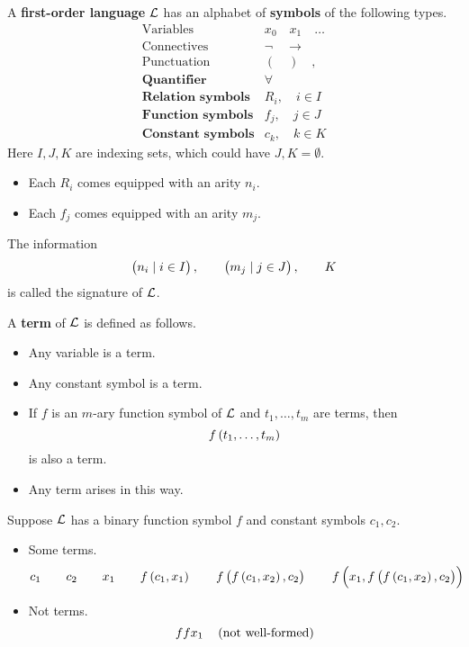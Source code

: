 \begin{definition}
\label{def:2.2.1}
A \textbf{first-order language} $ \mathcal{L} $ has an alphabet of \textbf{symbols} of the following types.
$$
\begin{array}{ll}
\text{Variables} & x_0 \quad x_1 \quad \dots \\
\text{Connectives} & \neg \quad \rightarrow \\
\text{Punctuation} & ( \quad ) \quad , \\
\textbf{Quantifier} & \forall \\
\textbf{Relation symbols} & R_i, \quad i \in I \\
\textbf{Function symbols} & f_j, \quad j \in J \\
\textbf{Constant symbols} & c_k, \quad k \in K
\end{array}
$$
Here $ I, J, K $ are indexing sets, which could have $ J, K = \emptyset $.
\begin{itemize}
\item Each $ R_i $ comes equipped with an arity $ n_i $.
\item Each $ f_j $ comes equipped with an arity $ m_j $.
\end{itemize}
The information
$$ \br{n_i \mid i \in I}, \qquad \br{m_j \mid j \in J}, \qquad K $$
is called the signature of $ \mathcal{L} $.
\end{definition}

\pagebreak

\begin{definition}
A \textbf{term} of $ \mathcal{L} $ is defined as follows.
\begin{itemize}
\item Any variable is a term.
\item Any constant symbol is a term.
\item If $ f $ is an $ m $-ary function symbol of $ \mathcal{L} $ and $ t_1, \dots, t_m $ are terms, then
$$ f\br{t_1, \dots, t_m} $$
is also a term.
\item Any term arises in this way.
\end{itemize}
\end{definition}

\begin{example*}
Suppose $ \mathcal{L} $ has a binary function symbol $ f $ and constant symbols $ c_1, c_2 $.
\begin{itemize}
\item Some terms.
$$ c_1 \qquad c_2 \qquad x_1 \qquad f\br{c_1, x_1} \qquad f\br{f\br{c_1, x_2}, c_2} \qquad f\br{x_1, f\br{f\br{c_1, x_2}, c_2}} $$
\item Not terms.
$$ ffx_1 \quad \br{\text{not well-formed}} $$
\end{itemize}
\end{example*}

